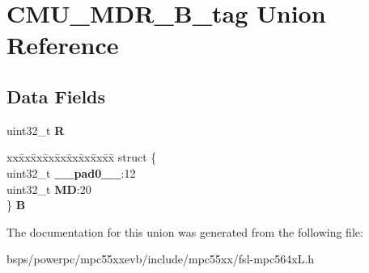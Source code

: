 \hypertarget{unionCMU__MDR__32B__tag}{}\section{C\+M\+U\+\_\+\+M\+D\+R\+\_\+B\+\_\+tag Union Reference}
\label{unionCMU__MDR__32B__tag}
\subsection*{Data Fields}
\begin{DoxyCompactItemize}
\item 
\mbox{\label{unionCMU__MDR__32B__tag_a67bf5704e610f94666a0b1b33791b3cd}} 
uint32\+\_\+t {\bfseries R}
\item 
\mbox{\label{unionCMU__MDR__32B__tag_a77e707c593907345237fec5de991e5c2}} 
\begin{tabbing}
xx\=xx\=xx\=xx\=xx\=xx\=xx\=xx\=xx\=\kill
struct \{\\
\>uint32\_t {\bfseries \_\_pad0\_\_}:12\\
\>uint32\_t {\bfseries MD}:20\\
\} {\bfseries B}\\

\end{tabbing}\end{DoxyCompactItemize}


The documentation for this union was generated from the following file\+:\begin{DoxyCompactItemize}
\item 
bsps/powerpc/mpc55xxevb/include/mpc55xx/fsl-\/mpc564x\+L.\+h\end{DoxyCompactItemize}
